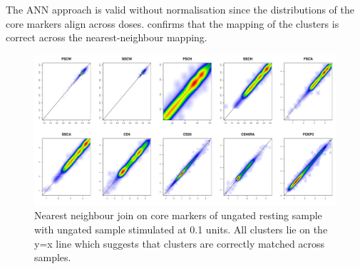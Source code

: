 The \gls{ANN} approach is valid without normalisation since the distributions of the core markers align across doses.
 confirms that the mapping of the clusters is correct across the nearest-neighbour mapping.
\begin{figure}[h]
\centering
\includegraphics[scale=.3]{IL2/figures/ann-join-0U-01U.pdf}
{Nearest neighbour join on core markers of ungated resting sample with ungated sample stimulated at 0.1 units. }
{
All clusters lie on the y=x line which suggests that clusters are correctly matched across samples.
}
\end{figure} 
